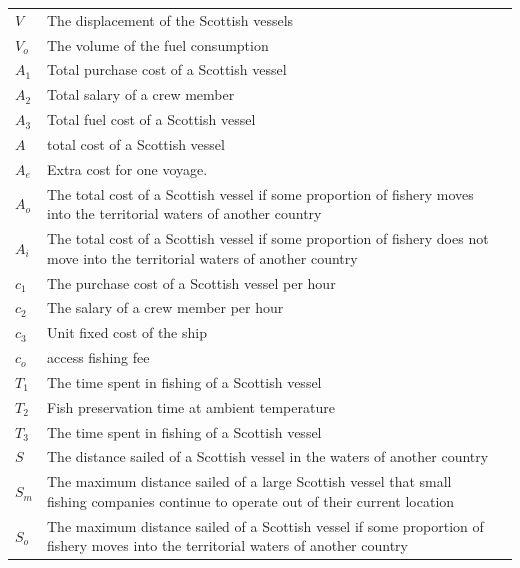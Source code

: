 \documentclass{mcmthesis}
\begin{document}
\begin{center}
\begin{longtable}{p{}p{}m{}}
$V$      & The displacement of the Scottish vessels 
                                                          \\
$V_o$      & The volume of the fuel consumption
                                                          \\
$A_1$     & Total purchase cost of a Scottish vessel
                                                        \\
$A_2$       & Total salary of a crew member                                                           \\
$A_3$      & Total fuel cost of a Scottish vessel                                        \\
$A$      & total cost of a Scottish vessel                                        \\
$A_e$      &Extra cost for one voyage.  \\
$A_o$      &The total cost of a Scottish vessel   if  some proportion of fishery moves into the territorial waters of another country\\
$A_i$      &The total cost of a Scottish vessel   if  some proportion of fishery does not move into the territorial waters of another country \\
$c_1$     & The purchase cost of a Scottish vessel per hour
                                                        \\
$c_2$       & The salary of a crew member per hour                                                     \\
$c_3$      & Unit fixed cost of the ship  \\
$c_o$      &access fishing fee\\
$T_1$     & The time spent in fishing of a Scottish vessel      \\
$T_2$       & Fish preservation time at ambient temperature        \\
$T_3$     & The time spent in fishing of a Scottish vessel      \\
$S$      & The distance sailed of a Scottish vessel  in the waters of another country  \\
$S_m$      & The maximum distance sailed of a large Scottish vessel that small fishing companies continue to operate out of their current  location \\
$S_o$      & The maximum distance sailed of a Scottish vessel   if  some proportion of fishery moves into the territorial waters of another country \\

\end{longtable}
\end{center}
\end{document}
